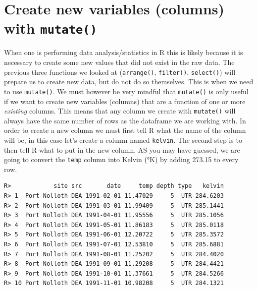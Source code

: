 \documentclass[]{book}
\newenvironment{Shaded}{\begin{snugshade}}{\end{snugshade}}
\newcommand{\KeywordTok}[1]{\textcolor[rgb]{0.13,0.29,0.53}{\textbf{#1}}}
\newcommand{\DataTypeTok}[1]{\textcolor[rgb]{0.13,0.29,0.53}{#1}}
\newcommand{\FloatTok}[1]{\textcolor[rgb]{0.00,0.00,0.81}{#1}}
\newcommand{\StringTok}[1]{\textcolor[rgb]{0.31,0.60,0.02}{#1}}
\newcommand{\OperatorTok}[1]{\textcolor[rgb]{0.81,0.36,0.00}{\textbf{#1}}}
\newcommand{\ErrorTok}[1]{\textcolor[rgb]{0.64,0.00,0.00}{\textbf{#1}}}
\newcommand{\NormalTok}[1]{#1}
\theoremstyle{definition}
\theoremstyle{definition}
\theoremstyle{definition}
\theoremstyle{remark}
\begin{document}
\section{\texorpdfstring{Create new variables (columns) with
\texttt{mutate()}}{Create new variables (columns) with mutate()}}\label{create-new-variables-columns-with-mutate}

When one is performing data analysis/statistics in R this is likely
because it is necessary to create some new values that did not exist in
the raw data. The previous three functions we looked at
(\texttt{arrange()}, \texttt{filter()}, \texttt{select()}) will prepare
us to create new data, but do not do so themselves. This is when we need
to use \texttt{mutate()}. We must however be very mindful that
\texttt{mutate()} is only useful if we want to create new variables
(columns) that are a function of one or more \emph{existing} columns.
This means that any column we create with \texttt{mutate()} will always
have the same number of rows as the dataframe we are working with. In
order to create a new column we must first tell R what the name of the
column will be, in this case let's create a column named
\texttt{kelvin}. The second step is to then tell R what to put in the
new column. AS you may have guessed, we are going to convert the
\texttt{temp} column into Kelvin (°K) by adding 273.15 to every row.

\begin{Shaded}
\end{Shaded}

\begin{verbatim}
R>            site src       date     temp depth type   kelvin
R> 1  Port Nolloth DEA 1991-02-01 11.47029     5  UTR 284.6203
R> 2  Port Nolloth DEA 1991-03-01 11.99409     5  UTR 285.1441
R> 3  Port Nolloth DEA 1991-04-01 11.95556     5  UTR 285.1056
R> 4  Port Nolloth DEA 1991-05-01 11.86183     5  UTR 285.0118
R> 5  Port Nolloth DEA 1991-06-01 12.20722     5  UTR 285.3572
R> 6  Port Nolloth DEA 1991-07-01 12.53810     5  UTR 285.6881
R> 7  Port Nolloth DEA 1991-08-01 11.25202     5  UTR 284.4020
R> 8  Port Nolloth DEA 1991-09-01 11.29208     5  UTR 284.4421
R> 9  Port Nolloth DEA 1991-10-01 11.37661     5  UTR 284.5266
R> 10 Port Nolloth DEA 1991-11-01 10.98208     5  UTR 284.1321
\end{verbatim}
\end{document}

